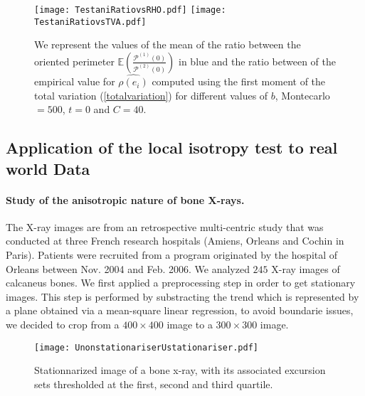 \documentclass[12pt]{article}
\renewcommand{\hat}{\widehat}
\theoremstyle{Theorem}
\theoremstyle{definition}
\begin{document}
\begin{figure}[H]
  \centering
    {\texttt{[image: TestaniRatiovsRHO.pdf]}}
    {\texttt{[image: TestaniRatiovsTVA.pdf]}}
    \hspace{0.2cm} 
 \caption{We represent the values of the mean of the ratio between the oriented perimeter $\mathbb{E}\left(\frac{\mathcal{P}^{(1)}(0)}{\mathcal{P}^{(2)}(0)}\right)$ in blue and the ratio between of the empirical value for $\hat{\rho(e_i)}$ computed using the first moment of the total variation (\ref{totalvariation}) for different values of $b$, Montecarlo $= 500$, $t = 0$ and $C = 40$.}
\end{figure}
\subsection{Application of the local isotropy test to real world Data}
\paragraph{Study of the anisotropic nature of bone X-rays.}
The X-ray images are from an retrospective multi-centric study that was conducted at
three French research hospitals (Amiens, Orleans and Cochin in Paris). Patients were recruited from a program originated by the hospital of Orleans between Nov. 2004 and Feb. 2006. We analyzed $245$ X-ray images of calcaneus bones. 
We first applied a preprocessing step in order to get stationary images. This step is performed by substracting the trend which is represented by a plane obtained via a mean-square linear regression, to avoid boundarie issues, we decided to crop from a $400\times400$  image to a $300\times300$ image.
\begin{figure}[H]
\centering
{\texttt{[image: UnonstationariserUstationariser.pdf]}}
 \caption{Stationnarized image of a bone x-ray, with its associated excursion sets thresholded at the first, second and third quartile.}
\label{fig22}
\end{figure}
\end{document}
